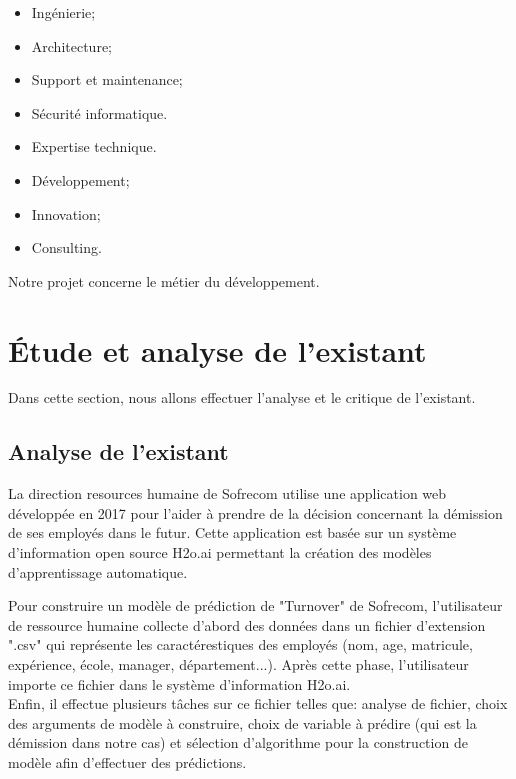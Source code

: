      \begin{itemize}
    \item Ingénierie;
    \item Architecture;
    \item Support et maintenance;
    \item Sécurité informatique.
    \item Expertise technique.
    \item Développement;
    \item Innovation;
    \item Consulting.
    \end{itemize}
    Notre projet concerne le métier du développement.


\section{\'Etude et analyse de l'existant }
Dans cette section, nous allons effectuer l'analyse et le critique de l'existant.
    \subsection{Analyse de l’existant}
La direction resources humaine de Sofrecom utilise une application web développée en 2017 pour l'aider à prendre de la décision concernant la démission de ses employés dans le futur.
Cette application est basée sur un système d'information open source H2o.ai permettant la création des modèles d'apprentissage automatique.

Pour construire un modèle de prédiction de "Turnover" de Sofrecom, l'utilisateur de ressource humaine collecte d'abord des données dans un fichier d'extension ".csv" qui représente les caractérestiques des employés (nom, age, matricule, expérience, école, manager, département...).
Après cette phase, l'utilisateur importe ce fichier dans le système d'information H2o.ai.\\ 
Enfin, il effectue plusieurs tâches sur ce fichier telles que:  analyse de fichier, choix des arguments de modèle à construire, choix de variable à prédire (qui est la démission dans notre cas) et sélection d'algorithme pour la construction de modèle afin d'effectuer des prédictions. 

